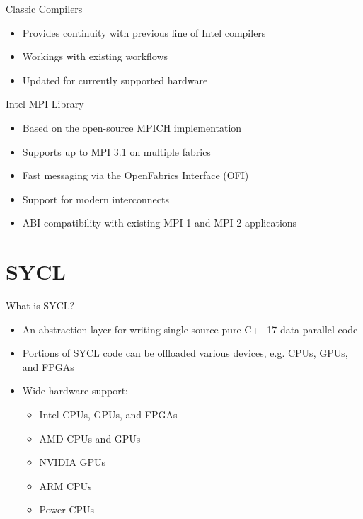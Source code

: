 \documentclass[aspectratio=169]{beamer}
\begin{document}
\begin{frame}{Classic Compilers}
\begin{itemize}
  \item Provides continuity with previous line of Intel compilers
  \item Workings with existing workflows
  \item Updated for currently supported hardware
\end{itemize}
\end{frame}

\begin{frame}{Intel MPI Library}
\begin{itemize}
  \item Based on the open-source MPICH implementation
  \item Supports up to MPI 3.1 on multiple fabrics
  \item Fast messaging via the OpenFabrics Interface (OFI)
  \item Support for modern interconnects
  \item ABI compatibility with existing MPI-1 and MPI-2 applications
\end{itemize}
\end{frame}

\section{SYCL}

\begin{frame}{What is SYCL?}
\begin{itemize}
  \item An abstraction layer for writing single-source pure C++17 data-parallel code
  \item Portions of SYCL code can be offloaded various devices, e.g. CPUs, GPUs, and FPGAs
  \item Wide hardware support:
  \begin{itemize}
    \item Intel CPUs, GPUs, and FPGAs
    \item AMD CPUs and GPUs
    \item NVIDIA GPUs
    \item ARM CPUs
    \item Power CPUs
  \end{itemize}
\end{itemize}
\end{frame}
\end{document}
